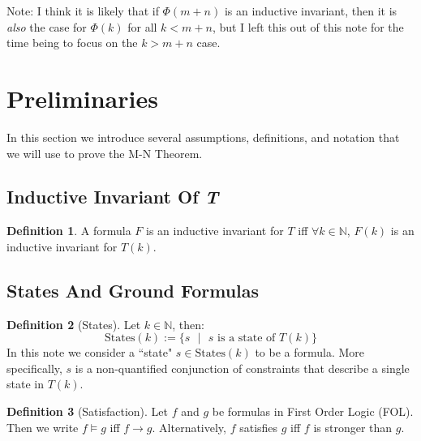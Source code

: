 \documentclass[12pt]{article}
\theoremstyle{definition}
\newtheorem{definition}{Definition}
\theoremstyle{remark}
\newcommand{\st}{\text{ }|\text{ }}
\newcommand{\states}{\text{States}}
\begin{document}
Note: I think it is likely that if $\Phi(m+n)$ is an inductive invariant, then it is \textit{also} the case for $\Phi(k)$ for all $k<m+n$, but I left this out of this note for the time being to focus on the $k>m+n$ case.



\section{Preliminaries}
In this section we introduce several assumptions, definitions, and notation that we will use to prove the M-N Theorem.

\subsection{Inductive Invariant Of \textit{T}}
\begin{definition}
  A formula $F$ is an inductive invariant for $T$ iff $\forall k \in \mathbb{N}$, $F(k)$ is an inductive invariant for $T(k)$.
\end{definition}


\subsection{States And Ground Formulas}
\begin{definition}[States]
  Let $k \in \mathbb{N}$, then:
  $$\states(k) := \{s \st s \text{ is a state of } T(k)\}$$
  In this note we consider a ``state" $s \in \states(k)$ to be a formula.  More specifically, $s$ is a non-quantified conjunction of constraints that describe a single state in $T(k)$.
\end{definition}

\begin{definition}[Satisfaction]
  Let $f$ and $g$ be formulas in First Order Logic (FOL).  Then we write $f \models g$ iff $f \rightarrow g$.  Alternatively, $f$ satisfies $g$ iff $f$ is stronger than $g$.
\end{definition}
\end{document}
